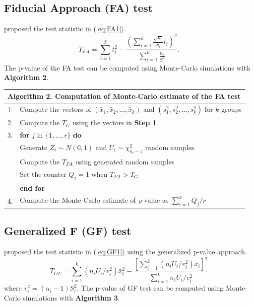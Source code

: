 \subsection{Fiducial Approach (FA) test}

\cite{li:2011} proposed the test statistic in (\ref{eq:FA1}).
\begin{equation}
T_{FA}=\sum_{i=1}^k t_i^2-\frac{(\sum_{i=1}^k \frac{\sqrt{n_i}}{S_i}t_i)^2}{\sum_{i=1}^k \frac{n_i}{S_i^2}} \label{eq:FA1}.
\end{equation}
The p-value of the FA test can be computed using Monte-Carlo simulations with \textbf{Algorithm 2}.

\begin{table}[h]
\centering
\begin{tabular}{ll}\midrule
\multicolumn{2}{l}{\textbf{Algorithm 2.} Computation of Monte-Carlo estimate of the FA test}\\\midrule
1.&Compute the vectors of $(\bar{x}_1, \bar{x}_2, ..., \bar{x}_k)$ and $(s_1^2, s_2^2, ..., s_k^2)$ for $k$ groups\\
2.&Compute the $T_G$ using the vectors in \textbf{Step 1}\\
3.&\textbf{for} $j$ in $\{1, ..., r\}$ \textbf{do}\\
   &Generate $Z_i \sim N(0, 1)$ and $U_i \sim \chi^2_{n_i-1}$ random samples\\
   &Compute the $T_{FA}$ using generated random samples\\
   &Set the counter $Q_j=1$ when $T_{FA}>T_G$\\
   &\textbf{end for}\\
4.&Compute the Monte-Carlo estimate of p-value as $\sum_{i=1}^k Q_j/r$\\\midrule
\end{tabular}
\end{table}
\subsection{Generalized F (GF) test}

\cite{weerahandi:1995} proposed the test statistic in (\ref{eq:GF1}) using the generalized p-value approach. 
\begin{equation}
T_{GF}=\sum_{i=1}^k (n_iU_i/v_i^2)\bar{x}_i^2-\frac{[\sum_{i=1}^k (n_iU_i/v_i^2)\bar{x}_i]^2}{\sum_{i=1}^k n_iU_i/v_i^2} \label{eq:GF1}
\end{equation}
where $v_i^2=(n_i-1)S_i^2$. The p-value of GF test can be computed using Monte-Carlo simulations with \textbf{Algorithm 3}.


